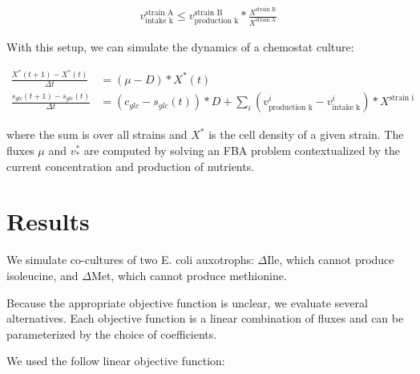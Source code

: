 \documentclass[11pt, letterpaper]{article}
\begin{document}
\begin{align*} 
  v_{\text{intake k}}^{\text{strain A}} \le
  v_{\text{production k}}^{\text{strain B}} * 
  \frac{X^{\text{strain B}}}{X^{\text{strain A}}} 
\end{align*} 

With this setup, we can simulate the dynamics of a chemostat culture:

\begin{align*} 
  \frac{X^*(t+1) - X^*(t)}{\Delta t} &= 
  (\mu - D) * X^*(t) 
  \\
  \frac{s_{glc}(t+1) - s_{glc}(t)}{\Delta t} &= 
  (c_{glc} - s_{glc}(t)) * D + 
  \sum_i (v^i_{\text{production k}} - v^i_{\text{intake k}}) * X^{\text{strain i}}
\end{align*} 

where the sum is over all strains and $X^*$ is the cell density of a given strain.
The fluxes $\mu$ and $v^*_*$ are computed by solving an FBA problem contextualized by the current concentration and production of nutrients. 

\section{Results}


We simulate co-cultures of two E. coli auxotrophs: $\Delta$Ile, which cannot produce isoleucine, and $\Delta$Met, which cannot produce methionine.

Because the appropriate objective function is unclear, we evaluate several alternatives. Each objective function is a linear combination of fluxes and can be parameterized by the choice of coefficients.

We used the follow linear objective function:
\end{document}
